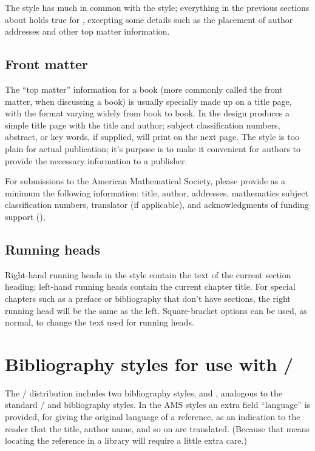 The  style has much in common with the 
style; everything in the previous sections about 
holds true for , excepting some details
such as the placement of author addresses and other top matter
information.

\subsection{Front matter}
The ``top matter'' information for a book (more commonly called the front matter,
when discussing a book)
is usually specially made up on a title page, with the format
varying widely from book to book.  In the  design
 produces a simple title page with the title
and author; subject classification numbers, abstract, or
key words, if supplied, will print on the next page.
The style is too plain for actual publication;
it's purpose is to make it convenient for authors to provide
the necessary information to a publisher.

For submissions to the
American Mathematical Society, please provide as a minimum the
following information: title, author, addresses, mathematics
subject classification numbers, translator (if applicable),
and acknowledgments of funding support (),

\subsection{Running heads}

Right-hand running heads in the  style contain
the text of the current section heading; left-hand running
heads contain the current chapter title.  For special chapters
such as a preface or bibliography that don't have sections,
the right running head will be the same as the left.
Square-bracket options can be used, as normal, to change
the text used for running heads.

\section{Bibliography styles for use with \bibtex/}

The \amslatex/ distribution includes two bibliography styles,
 and , analogous to the standard \latex/
 and  bibliography styles.  In the AMS
styles an extra field ``language'' is provided, for giving the
original language of a reference, as an indication to the
reader that the title, author name, and so on are translated.
(Because that means locating the reference in a library will
require a little extra care.)

